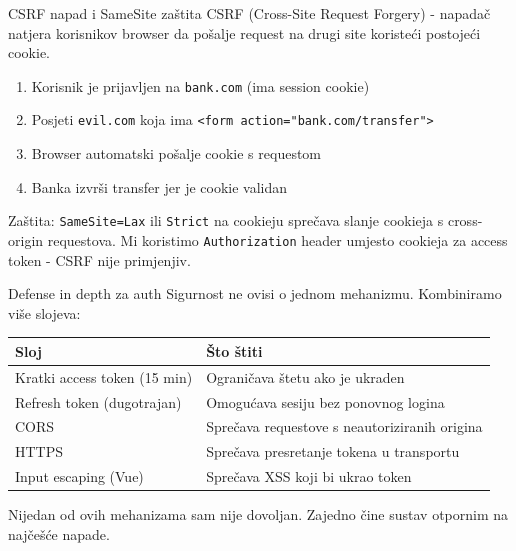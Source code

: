\begin{frame}{CSRF napad i SameSite zaštita}
CSRF (Cross-Site Request Forgery) - napadač natjera korisnikov browser da pošalje request na drugi site koristeći postojeći cookie.

\vspace{0.4em}
\begin{enumerate}
  \item Korisnik je prijavljen na \texttt{bank.com} (ima session cookie)
  \item Posjeti \texttt{evil.com} koja ima \texttt{<form action="bank.com/transfer">}
  \item Browser automatski pošalje cookie s requestom
  \item Banka izvrši transfer jer je cookie validan
\end{enumerate}

\vspace{0.6em}
Zaštita: \texttt{SameSite=Lax} ili \texttt{Strict} na cookieju sprečava slanje cookieja s cross-origin requestova. Mi koristimo \texttt{Authorization} header umjesto cookieja za access token - CSRF nije primjenjiv.
\end{frame}

\begin{frame}{Defense in depth za auth}
Sigurnost ne ovisi o jednom mehanizmu. Kombiniramo više slojeva:

\vspace{0.4em}
\begin{tabular}{@{}lp{8cm}@{}}
  \toprule
  \textbf{Sloj} & \textbf{Što štiti} \\
  \midrule
  Kratki access token (15 min) & Ograničava štetu ako je ukraden \\
  Refresh token (dugotrajan) & Omogućava sesiju bez ponovnog logina \\
  CORS & Sprečava requestove s neautoriziranih origina \\
  HTTPS & Sprečava presretanje tokena u transportu \\
  Input escaping (Vue) & Sprečava XSS koji bi ukrao token \\
  \bottomrule
\end{tabular}

\vspace{0.6em}
Nijedan od ovih mehanizama sam nije dovoljan. Zajedno čine sustav otpornim na najčešće napade.
\end{frame}

